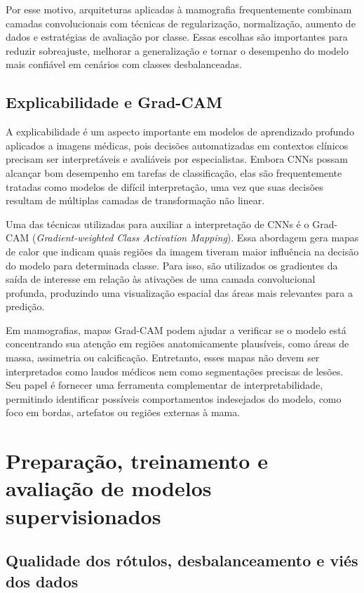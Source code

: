 \documentclass[
    12pt,
    openright,
    oneside,
    a4paper,
    english,
    brazil
]{abntex2}
\begin{document}
Por esse motivo, arquiteturas aplicadas à mamografia frequentemente combinam camadas convolucionais com técnicas de regularização, normalização, aumento de dados e estratégias de avaliação por classe. Essas escolhas são importantes para reduzir sobreajuste, melhorar a generalização e tornar o desempenho do modelo mais confiável em cenários com classes desbalanceadas.

\subsection{Explicabilidade e Grad-CAM}

A explicabilidade é um aspecto importante em modelos de aprendizado profundo aplicados a imagens médicas, pois decisões automatizadas em contextos clínicos precisam ser interpretáveis e avaliáveis por especialistas. Embora CNNs possam alcançar bom desempenho em tarefas de classificação, elas são frequentemente tratadas como modelos de difícil interpretação, uma vez que suas decisões resultam de múltiplas camadas de transformação não linear.

Uma das técnicas utilizadas para auxiliar a interpretação de CNNs é o Grad-CAM (\textit{Gradient-weighted Class Activation Mapping}). Essa abordagem gera mapas de calor que indicam quais regiões da imagem tiveram maior influência na decisão do modelo para determinada classe. Para isso, são utilizados os gradientes da saída de interesse em relação às ativações de uma camada convolucional profunda, produzindo uma visualização espacial das áreas mais relevantes para a predição.


Em mamografias, mapas Grad-CAM podem ajudar a verificar se o modelo está concentrando sua atenção em regiões anatomicamente plausíveis, como áreas de massa, assimetria ou calcificação. Entretanto, esses mapas não devem ser interpretados como laudos médicos nem como segmentações precisas de lesões. Seu papel é fornecer uma ferramenta complementar de interpretabilidade, permitindo identificar possíveis comportamentos indesejados do modelo, como foco em bordas, artefatos ou regiões externas à mama.

\section{Preparação, treinamento e avaliação de modelos supervisionados}

\subsection{Qualidade dos rótulos, desbalanceamento e viés dos dados}
\label{subsec:qualidade_rotulos_balanceamento_vies}
\end{document}
